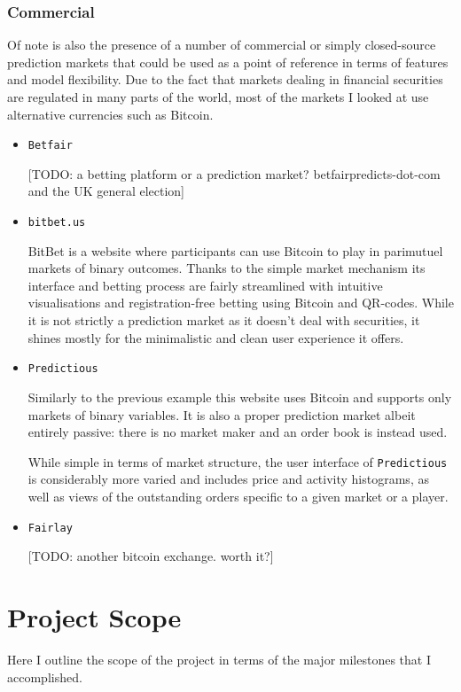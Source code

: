 \documentclass[bsc,frontabs,twoside,singlespacing,parskip,deptreport]{infthesis}     %
\begin{document}
\subsection{Commercial}
    Of note is also the presence of a number of commercial or simply closed-source prediction markets that could be used as a point of reference in terms of features and model flexibility. Due to the fact that markets dealing in financial securities are regulated in many parts of the world, most of the markets I looked at use alternative currencies such as Bitcoin. 
    
\begin{itemize}

\item {\tt Betfair}

    [TODO: a betting platform or a prediction market? betfairpredicts-dot-com and the UK general election]
    
\item {\tt bitbet.us}

    BitBet is a website where participants can use Bitcoin to play in parimutuel markets of binary outcomes. Thanks to the simple market mechanism its interface and betting process are fairly streamlined with intuitive visualisations and registration-free betting using Bitcoin and QR-codes. While it is not strictly a prediction market as it doesn't deal with securities, it shines mostly for the minimalistic and clean user experience it offers.

\item {\tt Predictious}

    Similarly to the previous example this website uses Bitcoin and supports only markets of binary variables. It is also a proper prediction market albeit entirely passive: there is no market maker and an order book is instead used.

    While simple in terms of market structure, the user interface of {\tt Predictious} is considerably more varied and includes price and activity histograms, as well as views of the outstanding orders specific to a given market or a player.


\item {\tt Fairlay} 

    [TODO: another bitcoin exchange. worth it?]

\end{itemize}


\chapter{Project Scope}
    Here I outline the scope of the project in terms of the major milestones that I accomplished.
\end{document}
